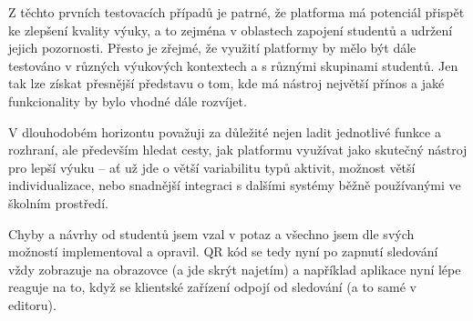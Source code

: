 Z těchto prvních testovacích případů je patrné, že platforma má potenciál přispět ke zlepšení kvality výuky, a to zejména v oblastech zapojení studentů a udržení jejich pozornosti. 
Přesto je zřejmé, že využití platformy by mělo být dále testováno v různých výukových kontextech a s různými skupinami studentů. 
Jen tak lze získat přesnější představu o tom, kde má nástroj největší přínos a jaké funkcionality by bylo vhodné dále rozvíjet.

V dlouhodobém horizontu považuji za důležité nejen ladit jednotlivé funkce a rozhraní, ale především hledat cesty, jak platformu využívat jako skutečný nástroj pro lepší výuku -- ať už jde o větší variabilitu typů aktivit, možnost větší individualizace, nebo snadnější integraci s dalšími systémy běžně používanými ve školním prostředí.

Chyby a návrhy od studentů jsem vzal v potaz a všechno jsem dle svých možností implementoval a opravil.
QR kód se tedy nyní po zapnutí sledování vždy zobrazuje na obrazovce (a jde skrýt najetím) a například aplikace nyní lépe reaguje na to, když se klientské zařízení odpojí od sledování (a to samé v editoru).

      



